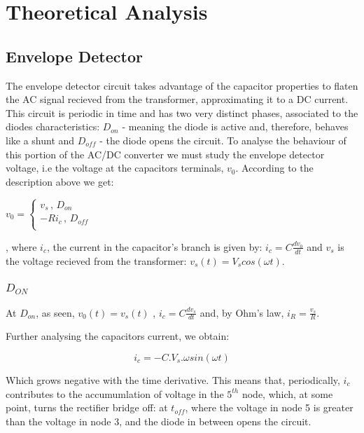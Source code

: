 \section{Theoretical Analysis}
\label{sec:analysis}

\subsection{Envelope Detector}

The envelope detector circuit takes advantage of the capacitor properties to flaten the AC signal recieved from the transformer, approximating it to a DC current. This circuit is periodic in time and has two very distinct phases, associated to the diodes characteristics: $D_{on}$ - meaning the diode is active and, therefore, behaves like a shunt and $D_{off}$ - the diode opens the circuit.  To analyse the behaviour of this portion of the AC/DC converter we must study the envelope detector voltage, i.e the voltage at the capacitors terminals, $v_0$. According to the description above we get:

\begin{center}
$
v_0 = 
\begin{cases} 
v_s \, , \, D_{on} \\ - R i_c \, , \, D_{off}\\ 
\end{cases}
$
\end{center}

, where $i_c$, the current in the capacitor's branch is given by: $i_c = C\frac{dv_0}{dt}$ and $v_s$ is the voltage recieved from the transformer: $v_s(t) = V_scos(\omega t)$.

\subsubsection{$D_{ON}$}

At $D_{on}$, as seen, $v_0(t) = v_s(t)$ , $i_c = C\frac{dv_s}{dt}$ and, by Ohm's law, $i_R = \frac{v_s}{R}$.\par

Further analysing the capacitors current, we obtain:


\begin{center}
	\begin{equation}
	i_c = -C.V_s.\omega sin(\omega t)
	\end{equation}
\end{center}

Which grows negative with the time derivative. This means that, periodically, $i_c$ contributes to the accumumlation of voltage in the $5^{th}$ node, which, at some point, turns the rectifier bridge off: at $t_{off}$, where the voltage in node 5 is greater than the voltage in node 3, and the diode in between opens the circuit.


